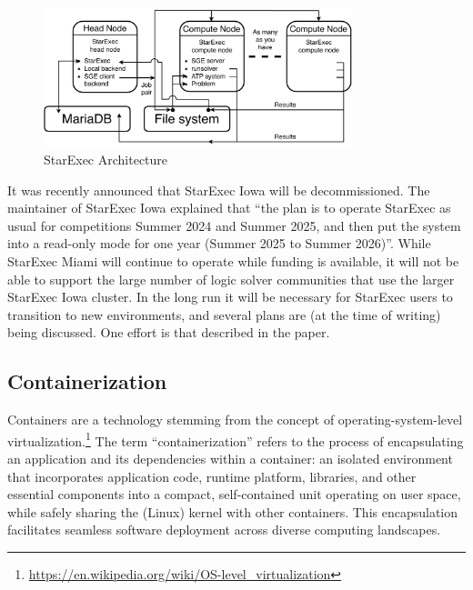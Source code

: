 \documentclass{easychair}
\begin{document}
\begin{figure}[htb]
\begin{center}
\includegraphics[width=0.8\textwidth]{ArchitectureS}
\caption{StarExec Architecture}
\label{ArchitectureS}
\end{center}
\end{figure}

It was recently announced that StarExec Iowa will be decommissioned. 
The maintainer of StarExec Iowa explained that ``the plan is to operate StarExec as usual for 
competitions Summer 2024 and Summer 2025, and then put the system into a read-only mode for one 
year (Summer 2025 to Summer 2026)''.
While StarExec Miami will continue to operate while funding is available, it will not be able
to support the large number of logic solver communities that use the larger StarExec Iowa cluster.
In the long run it will be necessary for StarExec users to transition to new environments,
and several plans are (at the time of writing) being discussed.
One effort is that described in the paper.

\subsection{Containerization}
\label{Containerization}

Containers are a technology stemming from the concept of operating-system-level virtualization.\footnote{\url{https://en.wikipedia.org/wiki/OS-level_virtualization}} The term ``containerization'' refers to the process of encapsulating an application and its dependencies within a container: an isolated environment that incorporates application code, runtime platform, libraries, and other essential components into a compact, self-contained unit operating on user space, while safely sharing the (Linux) kernel with other containers. This encapsulation facilitates seamless software deployment across diverse computing landscapes.
\end{document}
